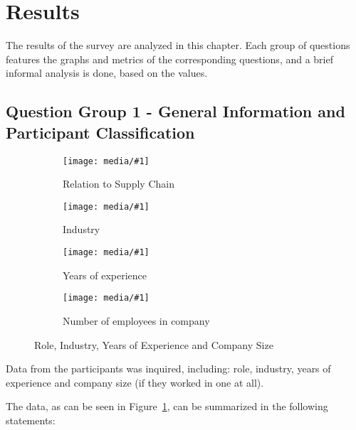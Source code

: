 \section{Results}



The results of the survey are analyzed in this chapter. Each group of questions features the graphs and metrics of the corresponding questions, and a brief informal analysis is done, based on the values.


\subsection{Question Group 1 - General Information and Participant Classification}

\newcommand{\resfig}[2]{
    \begin{subfigure}{.55\textwidth}
        \centering
        \texttt{[image: media/\#1]}
        \caption{#2}
    \end{subfigure}
}

\begin{figure}[ht]

    \resfig{sc_role}{Relation to Supply Chain}
    \resfig{sc_industry}{Industry}

    \resfig{sc_experience}{Years of experience}
    \resfig{nr_employees}{Number of employees in company}

      \caption{Role, Industry, Years of Experience and Company Size}
    \label{fig:group1_graphics}
\end{figure}


Data from the participants was inquired, including: role, industry, years of experience and company size (if  they worked in one at all).

The data, as can be seen in Figure~\ref{fig:group1_graphics}, can be summarized in the following statements:

